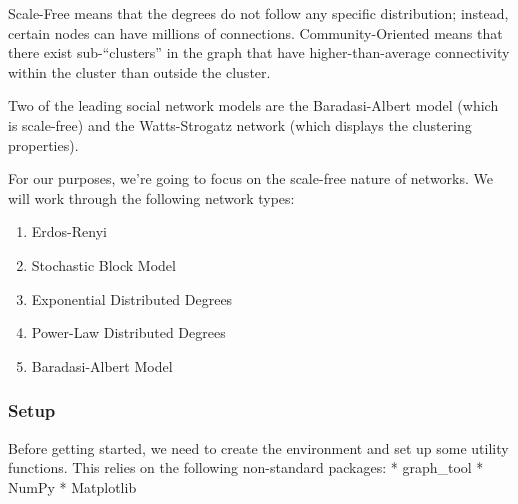 \documentclass[11pt]{article}
\providecommand{\tightlist}{%
      \setlength{\itemsep}{0pt}\setlength{\parskip}{0pt}}
\begin{document}
Scale-Free means that the degrees do not follow any specific
distribution; instead, certain nodes can have millions of connections.
Community-Oriented means that there exist sub-``clusters'' in the graph
that have higher-than-average connectivity within the cluster than
outside the cluster.

Two of the leading social network models are the Baradasi-Albert model
(which is scale-free) and the Watts-Strogatz network (which displays the
clustering properties).

For our purposes, we're going to focus on the scale-free nature of
networks. We will work through the following network types:

\begin{enumerate}
\def\labelenumi{\arabic{enumi}.}
\tightlist
\item
  Erdos-Renyi
\item
  Stochastic Block Model
\item
  Exponential Distributed Degrees
\item
  Power-Law Distributed Degrees
\item
  Baradasi-Albert Model
\end{enumerate}

    \hypertarget{setup}{%
\subsubsection{Setup}\label{setup}}

Before getting started, we need to create the environment and set up
some utility functions. This relies on the following non-standard
packages: * graph\_tool * NumPy * Matplotlib
\end{document}
